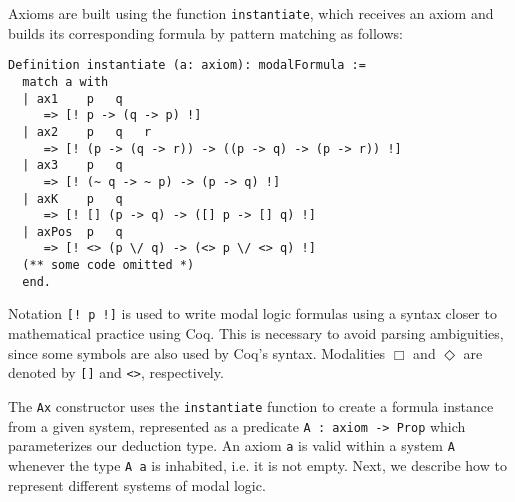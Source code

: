 \documentclass[sigconf]{acmart}
\begin{document}
Axioms are built using the function \texttt{instantiate}, which
receives an axiom and builds its corresponding formula by pattern matching as
follows:
\begin{verbatim}
Definition instantiate (a: axiom): modalFormula :=
  match a with
  | ax1    p   q
     => [! p -> (q -> p) !]
  | ax2    p   q   r
     => [! (p -> (q -> r)) -> ((p -> q) -> (p -> r)) !]
  | ax3    p   q
     => [! (~ q -> ~ p) -> (p -> q) !]
  | axK    p   q
     => [! [] (p -> q) -> ([] p -> [] q) !]
  | axPos  p   q
     => [! <> (p \/ q) -> (<> p \/ <> q) !]
  (** some code omitted *)
  end.
\end{verbatim}
Notation \texttt{[! p !]} is used to write modal logic formulas using a
syntax closer to mathematical practice using Coq. This is necessary to avoid
parsing ambiguities, since some symbols are also used by Coq's syntax.
Modalities $\Box$ and $\Diamond$ are denoted by \texttt{[]}
and \texttt{<>}, respectively.

The \texttt{Ax} constructor uses the \texttt{instantiate}
function to create a formula instance from a given system,
represented as a predicate
\texttt{A : axiom -> Prop} which parameterizes our deduction type. An
axiom \texttt{a} is valid within a system \texttt{A} whenever
the type \texttt{A a} is inhabited, i.e. it is not empty. Next, we
describe how to represent different systems of modal logic.
\end{document}
